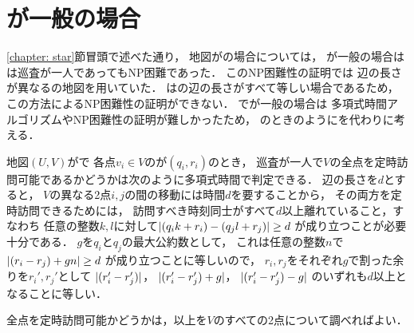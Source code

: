 \section{{\maxIdletime}が一般の場合}
\ref{chapter: star}節冒頭で述べた通り，
地図が{\graphStar}の場合については，
{\maxIdletime}が一般の場合は
{\patProb}は巡査が一人であってもNP困難であった\cite[Theorem~6]{coene2011charlemagne}．
このNP困難性の証明では
辺の長さが異なる{\graphStar}の地図を用いていた．
{\graphUnit}は{\graphStar}の辺の長さがすべて等しい場合であるため，
この方法によるNP困難性の証明ができない．
{\graphUnit}で{\maxIdletime}が一般の場合は
多項式時間アルゴリズムやNP困難性の証明が難しかったため，
{\graphLine}のときのように{\timeSpecifiedPatProb}を代わりに考える．


地図$(U, V)$が{\graphUnit}で
各点$v_i \in V$の{\exactTime}が$(q_i, r_i)$のとき，
巡査が一人で$V$の全点を定時訪問可能であるかどうかは次のように多項式時間で判定できる．
%
辺の長さを$d$とすると，
$V$の異なる2点$i, j$の間の移動には時間$d$を要することから，
その両方を定時訪問できるためには，
訪問すべき時刻同士がすべて$d$以上離れていること，すなわち
任意の整数$k, l$に対して$\lvert{(q_i k + r_i) - (q_j l + r_j)}\rvert \geq d$%
が成り立つことが必要十分である．
$g$を$q_i$と$q_j$の最大公約数として，
これは任意の整数$n$で
$\lvert{(r_i - r_j) + gn}\rvert \geq d$%
が成り立つことに等しいので，
$r_i, r_j$をそれぞれ$g$で割った余りを$r_i', r_j'$として
$\lvert{(r_i' - r_j')}\rvert$，%
$\lvert{(r_i' - r_j') + g}\rvert$，%
$\lvert{(r_i' - r_j') - g}\rvert$
のいずれも$d$以上となることに等しい．

全点を定時訪問可能かどうかは，以上を$V$のすべての2点について調べればよい．





